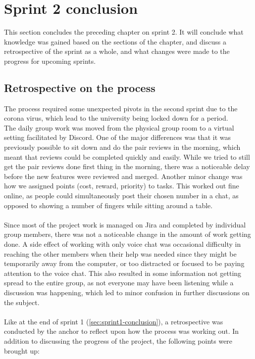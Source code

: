 \section{Sprint 2 conclusion}\label{sec:sprint2-conclusion}
This section concludes the preceding chapter on sprint 2.
It will conclude what knowledge was gained based on the sections of the chapter, and discuss a retrospective of the sprint as a whole, and what changes were made to the progress for upcoming sprints.



\subsection{Retrospective on the process}
The process required some unexpected pivots in the second sprint due to the corona virus, which lead to the university being locked down for a period.
\\
The daily group work was moved from the physical group room to a virtual setting facilitated by Discord.
One of the major differences was that it was previously possible to sit down and do the pair reviews in the morning, which meant that reviews could be completed quickly and easily.
While we tried to still get the pair reviews done first thing in the morning, there was a noticeable delay before the new features were reviewed and merged.
Another minor change was how we assigned points (cost, reward, priority) to tasks. This worked out fine online, as people could simultaneously post their chosen number in a chat, as opposed to showing a number of fingers while sitting around a table.
\\\\
Since most of the project work is managed on Jira and completed by individual group members, there was not a noticeable change in the amount of work getting done.
A side effect of working with only voice chat was occasional difficulty in reaching the other members when their help was needed since they might be temporarily away from the computer, or too distracted or focused to be paying attention to the voice chat.
This also resulted in some information not getting spread to the entire group, as not everyone may have been listening while a discussion was happening, which led to minor confusion in further discussions on the subject.\\\\
Like at the end of sprint 1 (\autoref{sec:sprint1-conclusion}), a retrospective was conducted by the anchor to reflect upon how the process was working out.
In addition to discussing the progress of the project, the following points were brought up:

